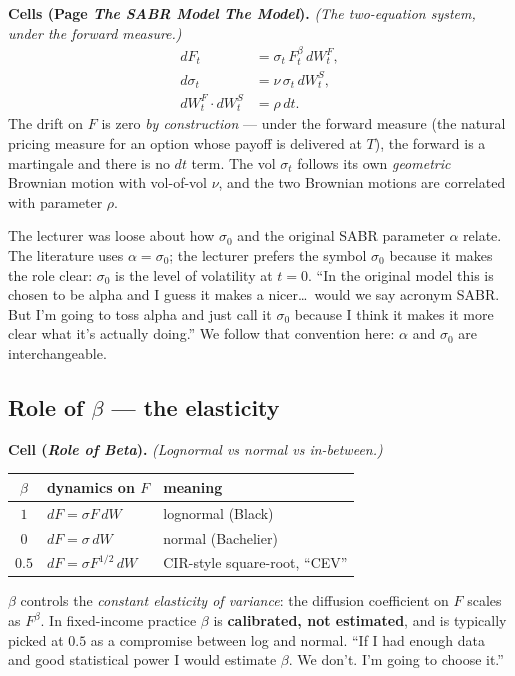 \begin{keyblock}
\textbf{Cells (Page \emph{The SABR Model} \textperiodcentered{} \emph{The
Model}).} \emph{(The two-equation system, under the forward measure.)}
\begin{align}
  dF_t &= \sigma_t\,F_t^{\beta}\,dW^{F}_t, \label{L7-eq:sabr-F}\\
  d\sigma_t &= \nu\,\sigma_t\,dW^{S}_t, \label{L7-eq:sabr-sigma}\\
  dW^{F}_t \cdot dW^{S}_t &= \rho\,dt. \label{L7-eq:sabr-rho}
\end{align}
The drift on $F$ is zero \emph{by construction} --- under the forward
measure (the natural pricing measure for an option whose payoff is
delivered at $T$), the forward is a martingale and there is no $dt$
term. The vol $\sigma_t$ follows its own \emph{geometric} Brownian
motion with vol-of-vol $\nu$, and the two Brownian motions are
correlated with parameter $\rho$.
\end{keyblock}

The lecturer was loose about how $\sigma_0$ and the original SABR
parameter $\alpha$ relate. The literature uses $\alpha = \sigma_0$;
the lecturer prefers the symbol $\sigma_0$ because it makes the role
clear: $\sigma_0$ is the level of volatility at $t = 0$. ``In the
original model this is chosen to be alpha and I guess it makes a
nicer\ldots\ would we say acronym SABR. But I'm going to toss alpha
and just call it $\sigma_0$ because I think it makes it more clear
what it's actually doing.'' We follow that convention here: $\alpha$
and $\sigma_0$ are interchangeable.

\subsection{Role of $\beta$ --- the elasticity}\label{L7-sec:beta}

\begin{keyblock}
\textbf{Cell (\emph{Role of Beta}).} \emph{(Lognormal vs normal vs
in-between.)}\\
\begin{center}
\begin{tabular}{c|l|l}
$\beta$ & dynamics on $F$ & meaning \\
\hline
$1$   & $dF = \sigma F\,dW$            & lognormal (Black) \\
$0$   & $dF = \sigma\,dW$              & normal (Bachelier) \\
$0.5$ & $dF = \sigma F^{1/2}\,dW$       & CIR-style square-root, ``CEV'' \\
\end{tabular}
\end{center}
$\beta$ controls the \emph{constant elasticity of variance}: the
diffusion coefficient on $F$ scales as $F^{\beta}$. In fixed-income
practice $\beta$ is \textbf{calibrated, not estimated}, and is
typically picked at $0.5$ as a compromise between log and normal.
``If I had enough data and good statistical power I would estimate
$\beta$. We don't. I'm going to choose it.''
\end{keyblock}

